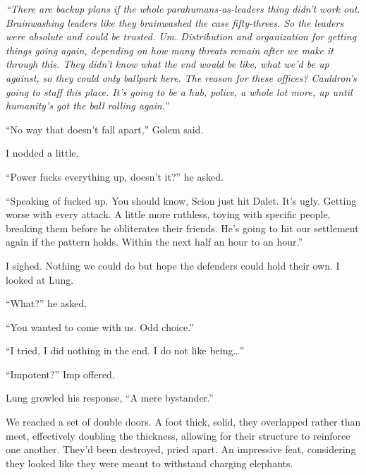 \emph{``There are backup plans if the whole parahumans-as-leaders thing didn't work out.  Brainwashing leaders like they brainwashed the case fifty-threes.  So the leaders were absolute and could be trusted.  Um.  Distribution and organization for getting things going again, depending on how many threats remain after we make it through this.  They didn't know }\emph{what the end would be like, what we'd be up against, so they could only ballpark here.  The reason for these offices?  Cauldron's going to staff this place.  It's going to be a hub, police, a whole lot more, up until humanity's got the ball rolling again.}''



``No way that doesn't fall apart,'' Golem said.



I nodded a little.



``Power fucks everything up, doesn't it?'' he asked.



``Speaking of fucked up.  You should know, Scion just hit Dalet.  It's ugly.  Getting worse with every attack.  A little more ruthless, toying with specific people, breaking them before he obliterates their friends.  He's going to hit our settlement again if the pattern holds.  Within the next half an hour to an hour.''



I sighed.  Nothing we could do but hope the defenders could hold their own.  I looked at Lung.



``What?'' he asked.



``You wanted to come with us.  Odd choice.''



``I tried, I did nothing in the end.  I do not like being\ldots''



``Impotent?'' Imp offered.



Lung growled his response, ``A mere bystander.''



We reached a set of double doors.  A foot thick, solid, they overlapped rather than meet, effectively doubling the thickness, allowing for their structure to reinforce one another.  They'd been destroyed, pried apart.  An impressive feat, considering they looked like they were meant to withstand charging elephants.



